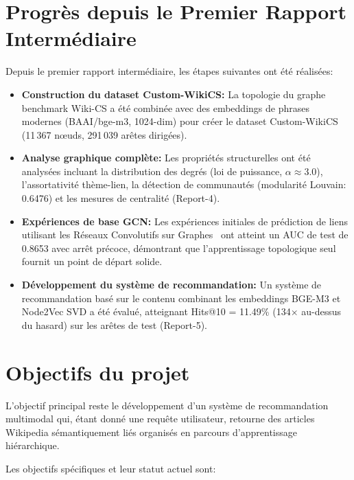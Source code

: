 \section{Progrès depuis le Premier Rapport Intermédiaire}

Depuis le premier rapport intermédiaire, les étapes suivantes ont été réalisées:

\begin{itemize}
    \item \textbf{Construction du dataset Custom-WikiCS:} La topologie du graphe benchmark Wiki-CS a été combinée avec des embeddings de phrases modernes (BAAI/bge-m3, 1024-dim) pour créer le dataset Custom-WikiCS (11\,367 nœuds, 291\,039 arêtes dirigées).
    \item \textbf{Analyse graphique complète:} Les propriétés structurelles ont été analysées incluant la distribution des degrés (loi de puissance, $\alpha \approx 3.0$), l'assortativité thème-lien, la détection de communautés (modularité Louvain: 0.6476) et les mesures de centralité (Report-4).
    \item \textbf{Expériences de base GCN:} Les expériences initiales de prédiction de liens utilisant les Réseaux Convolutifs sur Graphes~\cite{kipf2017semi} ont atteint un AUC de test de 0.8653 avec arrêt précoce, démontrant que l'apprentissage topologique seul fournit un point de départ solide.
    \item \textbf{Développement du système de recommandation:} Un système de recommandation basé sur le contenu combinant les embeddings BGE-M3 et Node2Vec SVD a été évalué, atteignant Hits@10 = 11.49\% (134$\times$ au-dessus du hasard) sur les arêtes de test (Report-5).
\end{itemize}

\section{Objectifs du projet}

L'objectif principal reste le développement d'un système de recommandation multimodal qui, étant donné une requête utilisateur, retourne des articles Wikipedia sémantiquement liés organisés en parcours d'apprentissage hiérarchique.

Les objectifs spécifiques et leur statut actuel sont:

